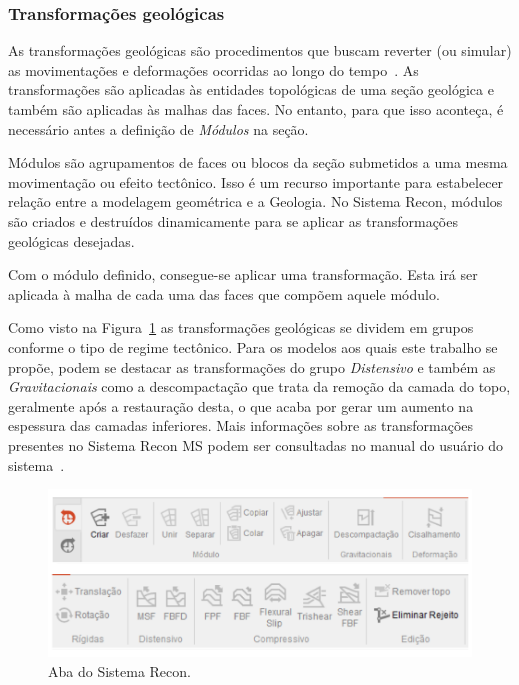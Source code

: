 \subsubsection{Transformações geológicas}

As transformações geológicas são procedimentos que buscam reverter (ou simular) as movimentações e deformações ocorridas ao longo do tempo~\cite{Santi}. As transformações são aplicadas às entidades topológicas de uma seção geológica e também são aplicadas às malhas das faces. No entanto, para que isso aconteça, é necessário antes a definição de \textit{Módulos} na seção. 

Módulos são agrupamentos de faces ou blocos da seção submetidos a uma mesma movimentação ou efeito tectônico. Isso é um recurso importante para estabelecer relação entre a modelagem geométrica e a Geologia. No Sistema Recon, módulos são criados e destruídos dinamicamente para se aplicar as transformações geológicas desejadas.

Com o módulo definido, consegue-se aplicar uma transformação. Esta irá ser aplicada à malha de cada uma das faces que compõem aquele módulo.

Como visto na Figura~\ref{fig-recon-5} as transformações geológicas se dividem em grupos conforme o tipo de regime tectônico. Para os modelos aos quais este trabalho se propõe, podem se destacar as transformações do grupo \emph{Distensivo} e também as \emph{Gravitacionais} como a descompactação que trata da remoção da camada do topo, geralmente após a restauração desta, o que acaba por gerar um aumento na espessura das camadas inferiores. Mais informações sobre as transformações presentes no Sistema Recon MS podem ser consultadas no manual do usuário do sistema~\cite{Recon}.

\begin{figure} [H]
  \begin{center}
    \includegraphics[width=\textwidth]{images/fig-recon-5}
    \caption{Aba  do Sistema Recon.}\label{fig-recon-5}
  \end{center}
\end{figure}

